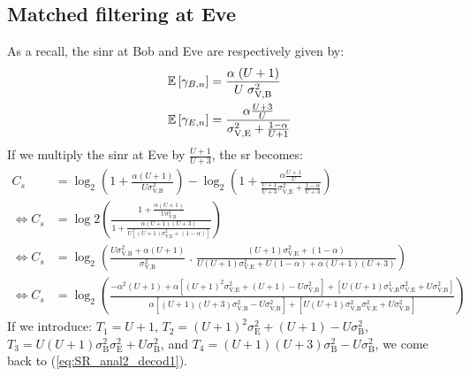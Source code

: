 \subsection{Matched filtering at Eve}
\label{appB:alpha_decod1}
As a recall, the \gls{sinr} at Bob and Eve are respectively given by:
\begin{equation}
\begin{split}
\mathbb{E} \left[\gamma_{B,n}\right] &= \frac{\alpha \;(U+1)}{U \; \sigma_{\text{V,B}}^2} \\
\mathbb{E} \left[\gamma_{E,n}\right] &= \frac{\alpha \frac{U+3}{U}}{\sigma^2_{\text{V,E}}+\frac{1-\alpha}{U+1}} 
\end{split}
\end{equation}
If we multiply the \gls{sinr} at Eve by $\frac{U+1}{U+3}$, the \gls{sr} becomes:
\begin{subequations}
	\begin{align}
	C_s &= \log_2\left(1+ \frac{\alpha (U+1)}{U  \sigma_{\text{V,B}}^2}\right) - \log_2\left(1 + \frac{\alpha\frac{U+1}{U}}{\frac{U+1}{U+3}\sigma^2_{\text{V,E}}+\frac{1-\alpha}{U+3}} \right)\\
	\Leftrightarrow C_s &= \log2\left(   \frac{1+ \frac{\alpha (U+1)}{U  \sigma_{\text{V,B}}^2}}{1 + \frac{\alpha (U+1)(U+3)}{U \left[ (U+1) \sigma_{\text{V,E}}^2 + (1-\alpha)\right]}}   \right) \\
	 \Leftrightarrow C_s &= \log_2\left(  \frac{U \sigma_{\text{V,B}}^2 + \alpha (U+1)}{\sigma_{\text{V,B}}^2} \; . \; \frac{(U+1) \sigma_{\text{V,E}}^2 + (1-\alpha)}{U(U+1) \sigma_{\text{V,E}}^2 + U(1-\alpha) + \alpha (U+1)(U+3)}   \right) \\
	 \Leftrightarrow C_s &= \log_2\left(  \frac{  -\alpha^2(U+1) + \alpha \left[ (U+1)^2 \sigma_{\text{V,E}}^2  + (U+1) - U \sigma_{\text{V,B}}^2 \right]  + \left[ U(U+1)\sigma_{\text{V,B}}^1 \sigma_{\text{V,E}}^2 + U \sigma_{\text{V,B}}^2\right] }{\alpha\left[ (U+1)(U+3)\sigma_{\text{V,B}}^2 - U \sigma_{\text{V,B}}^2 \right] + \left[ U(U+1)\sigma_{\text{V,B}}^2 \sigma_{\text{V,E}}^2 + U \sigma_{\text{V,B}}^2\right]}  \right) 
	\end{align}
\end{subequations}
If we introduce: $T_1 = U+1$, $T_2 = (U+1)^2\sigma_{\text{E}}^2 + (U+1) - U\sigma_{\text{B}}^2$, $T_3 = U(U+1)\sigma_{\text{B}}^2\sigma_{\text{E}}^2 + U \sigma_{\text{B}}^2$, and $T_4=(U+1)(U+3)\sigma_{\text{B}}^2-U\sigma_{\text{B}}^2$, we come back to (\ref{eq:SR_anal2_decod1}).

















